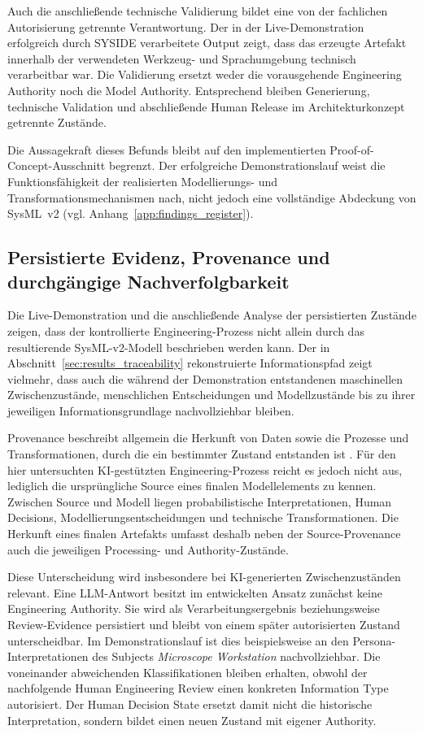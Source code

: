 Auch die anschließende technische Validierung bildet eine von der fachlichen
Autorisierung getrennte Verantwortung. Der in der Live-Demonstration
erfolgreich durch SYSIDE verarbeitete Output zeigt, dass das
erzeugte Artefakt innerhalb der verwendeten Werkzeug- und Sprachumgebung
technisch verarbeitbar war. Die Validierung ersetzt weder die vorausgehende
Engineering Authority noch die Model Authority. Entsprechend bleiben
Generierung, technische Validation und abschließende Human Release im
Architekturkonzept getrennte Zustände.

Die Aussagekraft dieses Befunds bleibt auf den implementierten
Proof-of-Concept-Ausschnitt begrenzt. Der erfolgreiche Demonstrationslauf weist die
Funktionsfähigkeit der realisierten Modellierungs- und
Transformationsmechanismen nach, nicht jedoch eine vollständige Abdeckung von
SysML~v2 (vgl. Anhang~\ref{app:findings_register}).

\subsection{Persistierte Evidenz, Provenance und durchgängige Nachverfolgbarkeit}
\label{sec:discussion_traceability}

Die Live-Demonstration und die anschließende Analyse der persistierten
Zustände zeigen, dass der kontrollierte Engineering-Prozess nicht allein
durch das resultierende SysML-v2-Modell beschrieben werden kann. Der in
Abschnitt~\ref{sec:results_traceability} rekonstruierte Informationspfad
zeigt vielmehr, dass auch die während der Demonstration entstandenen
maschinellen Zwischenzustände, menschlichen Entscheidungen und
Modellzustände bis zu ihrer jeweiligen Informationsgrundlage
nachvollziehbar bleiben.

Provenance beschreibt allgemein die Herkunft von Daten sowie die Prozesse und
Transformationen, durch die ein bestimmter Zustand entstanden ist
\cite{MoreauMissier2013,Simmhan2005}. Für den hier untersuchten
KI-gestützten Engineering-Prozess reicht es jedoch nicht aus, lediglich die
ursprüngliche Source eines finalen Modellelements zu kennen. Zwischen Source
und Modell liegen probabilistische Interpretationen, Human Decisions,
Modellierungsentscheidungen und technische Transformationen. Die Herkunft
eines finalen Artefakts umfasst deshalb neben der Source-Provenance auch die
jeweiligen Processing- und Authority-Zustände.

Diese Unterscheidung wird insbesondere bei KI-generierten Zwischenzuständen
relevant. Eine LLM-Antwort besitzt im entwickelten Ansatz zunächst keine
Engineering Authority. Sie wird als Verarbeitungsergebnis beziehungsweise
Review-Evidence persistiert und bleibt von einem später autorisierten Zustand
unterscheidbar. Im Demonstrationslauf ist dies beispielsweise an den
Persona-Interpretationen des Subjects \emph{Microscope Workstation}
nachvollziehbar. Die voneinander abweichenden Klassifikationen bleiben
erhalten, obwohl der nachfolgende Human Engineering Review einen konkreten
Information Type autorisiert. Der Human Decision State ersetzt damit nicht
die historische Interpretation, sondern bildet einen neuen Zustand mit
eigener Authority.

